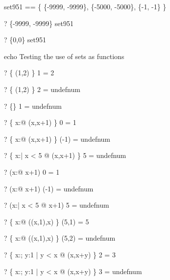 \begin{zed}
  set951 == \{ \{-9999, -9999\}, \{-5000, -5000\}, \{-1, -1\} \}
\end{zed}
\begin{zed} \vdash?  \{-9999, -9999\} \in set951 \end{zed}
\begin{zed} \vdash?  \{0,0\} \notin set951 \end{zed}


echo     Testing the use of sets as functions
\begin{zed} \vdash?   \{ (1,2) \} 1 = 2 \end{zed}
\begin{zed} \vdash?  \{ (1,2) \} 2 = undefnum \end{zed}
\begin{zed} \vdash?  \{\} 1 = undefnum \end{zed}
\begin{zed} \vdash?   \{ x:\nat @ (x,x+1) \} 0 = 1 \end{zed}
\begin{zed} \vdash?  \{ x:\nat @ (x,x+1) \} (-1) = undefnum \end{zed}
\begin{zed} \vdash?  \{ x:\nat | x < 5 @ (x,x+1) \} 5 = undefnum \end{zed}
\begin{zed} \vdash?   (\lambda x:\nat @ x+1) 0 = 1 \end{zed}
\begin{zed} \vdash?  (\lambda x:\nat @ x+1) (-1) = undefnum \end{zed}
\begin{zed} \vdash?  (\lambda x:\nat | x < 5 @ x+1) 5 = undefnum \end{zed}
\begin{zed} \vdash?   \{ x:\nat @ ((x,1),x) \} (5,1) = 5 \end{zed}
\begin{zed} \vdash?  \{ x:\nat @ ((x,1),x) \} (5,2) = undefnum \end{zed}
\begin{zed} \vdash?   \{ x:\nat; y:1  | y < x @ (x,x+y) \} 2 = 3 \end{zed}
\begin{zed} \vdash?  \{ x:\nat; y:1  | y < x @ (x,x+y) \} 3 = undefnum \end{zed}
